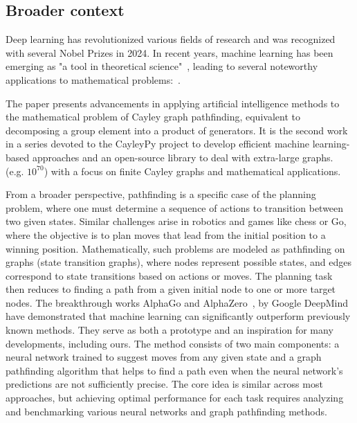 \documentclass[reqno,11pt]{amsart}
\begin{document}
\subsection{Broader context}
Deep learning has revolutionized various fields of research and was recognized with several Nobel Prizes in 2024.  
In recent years, machine learning has been emerging as "a tool in theoretical science"~\cite{douglas2022machine}, leading to several noteworthy applications to mathematical problems:~\cite{lample2019deep,davies2021advancing, bao2021polytopes, 
romera2024mathematical,
coates2024machine,alfarano2024global, charton2024patternboost,shehper2024makes,swirszcz2025advancing}.  %

The paper presents advancements in applying artificial intelligence methods to the mathematical problem of Cayley graph pathfinding, equivalent to decomposing a group element into a product of generators. It is the second work in a series devoted to the CayleyPy project to develop efficient machine learning-based approaches and an open-source library to deal with extra-large graphs.
(e.g. $10^{70}$) with a focus on finite Cayley graphs and mathematical applications.

From a broader perspective, pathfinding is a specific case of the planning problem, where one must determine a sequence of actions to transition between two given states. Similar challenges arise in robotics and games like chess or Go, where the objective is to plan moves that lead from the initial position to a winning position. Mathematically, such problems are modeled as pathfinding on graphs (state transition graphs), where nodes represent possible states, and edges correspond to state transitions based on actions or moves. The planning task then reduces to finding a path from a given initial node to one or more target nodes. The breakthrough works AlphaGo and AlphaZero~\cite{silver2016mastering}, 
\cite{silver2017mastering} by Google DeepMind have demonstrated that machine learning can significantly outperform previously known methods. They serve as both a prototype and an inspiration for many developments, including ours. The method consists of two main components: a neural network trained to suggest moves from any given state and a graph pathfinding algorithm that helps to find a path even when the neural network's predictions are not sufficiently precise. The core idea is similar across most approaches, but achieving optimal performance for each task requires analyzing and benchmarking various neural networks and graph pathfinding methods. 
\end{document}
